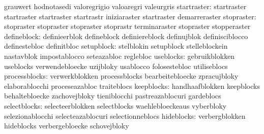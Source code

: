                                   grauwert                         hodnotasedi
                                  valoregrigio                     valoaregri
                                  valeurgris
                     startraster: startraster                      startraster
                                  startraster                      startrastr
                                  iniziaraster                     startraster
                                  demarreraster
                      stopraster: stopraster                       stopraster
                                  stopraster                       stoprastr
                                  terminaraster                    stopraster
                                  stopperaster
                     defineblock: definieerblok                    defineblock
                                  definiereblock                   definujblok
                                  definisciblocco                  definestebloc
                                  definitbloc
                      setupblock: stelblokin                       setupblock
                                  stelleblockein                   nastavblok
                                  impostablocco                    seteazabloc
                                  reglebloc
                       useblocks: gebruikblokken                   useblocks
                                  verwendebloecke                  uzijbloky
                                  usablocco                        folosestebloc
                                  utiliseblocs
                   processblocks: verwerkblokken                   processblocks
                                  bearbeitebloecke                 zpracujbloky
                                  elaborablocchi                   proceseazabloc
                                  traiteblocs
                      keepblocks: handhaafblokken                  keepblocks
                                  behaltebloecke                   zachovejbloky
                                  tieniblocchi                     pastreazablocuri
                                  gardeblocs
                    selectblocks: selecteerblokken                 selectblocks
                                  waehlebloeckeaus                 vyberbloky
                                  selezionablocchi                 selecteazablocuri
                                  selectionneblocs
                      hideblocks: verbergblokken                   hideblocks
                                  verbergebloecke                  schovejbloky
